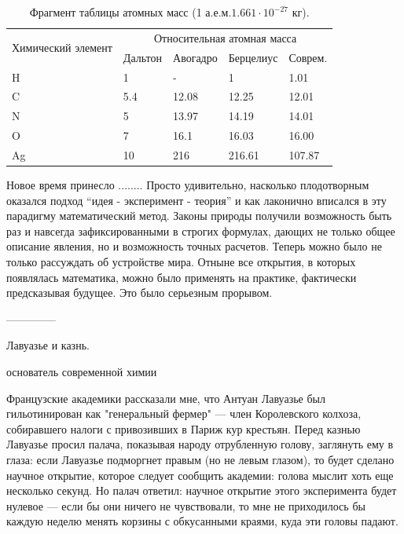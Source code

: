 \begin{table}
\label{tab:atom_mass}
    \begin{center}
        \begin{tabular}{|p{3cm}|p{2cm}|p{2cm}|p{2.2cm}|p{2cm}|}
            \hline
            \multirow{2}{}{Химический элемент} & \multicolumn{4}{|c|}{Относительная атомная масса} \\
            & Дальтон & Авогадро & Берцелиус & Соврем. \\
            \hline
            H & 1 & - & 1 & 1.01 \\
            C & 5.4 & 12.08 & 12.25 & 12.01 \\
            N & 5 & 13.97 & 14.19 & 14.01 \\
            O & 7 & 16.1 & 16.03 & 16.00 \\
            Ag & 10 & 216 & 216.61 & 107.87 \\
            \hline
        \end{tabular}
    \end{center}
\caption{Фрагмент таблицы атомных масс (1 а.е.м.\approx $1.661\cdot 10^{-27}$ кг).}
\end{table}






Новое время принесло ........ 
Просто удивительно, насколько плодотворным оказался подход ``идея - эксперимент - теория'' и как лаконично вписался в эту парадигму математический метод.
Законы природы получили возможность быть раз и навсегда зафиксированными в строгих формулах, дающих не только общее описание явления, но и возможность точных расчетов.
Теперь можно было не только рассуждать об устройстве мира.
Отныне все открытия, в которых появлялась математика, можно было применять на практике, фактически предсказывая будущее.
Это было серьезным прорывом.


--------------

Лавуазье и казнь.

основатель современной химии

Французские академики рассказали мне, что Антуан Лавуазье был гильотинирован как "генеральный фермер" — член Королевского колхоза, собиравшего налоги с привозивших в Париж кур крестьян. Перед казнью Лавуазье просил палача, показывая народу отрубленную голову, заглянуть ему в глаза: если Лавуазье подморгнет правым (но не левым глазом), то будет сделано научное открытие, которое следует сообщить академии: голова мыслит хоть еще несколько секунд. Но палач ответил: научное открытие этого эксперимента будет нулевое — если бы они ничего не чувствовали, то мне не приходилось бы каждую неделю менять корзины с обкусанными краями, куда эти головы падают.

